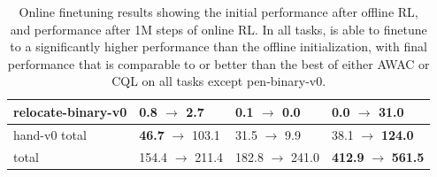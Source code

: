 \begin{table}[!htp]
\begin{tabular}{ l ||p{2.7cm} |p{2.7cm} | p{2.7cm}  }
    relocate-binary-v0 & \textbf{0.8}   $\rightarrow$ 2.7 & 0.1   $\rightarrow$ 0.0 & 0.0   $\rightarrow$ \textbf{31.0} \\ \hline
    hand-v0 total & \textbf{46.7}  $\rightarrow$ 103.1 & 31.5  $\rightarrow$ 9.9 & 38.1  $\rightarrow$ \textbf{124.0} \\ \hline \hline
    total & 154.4 $\rightarrow$ 211.4 & 182.8 $\rightarrow$ 241.0 & \textbf{412.9} $\rightarrow$ \textbf{561.5}
\end{tabular}
\captionsetup{justification=justified,format=plain}
\caption{Online finetuning results showing the initial performance after offline RL, and performance after 1M steps of online RL. In all tasks, \ourname is able to finetune to a significantly higher performance than the offline initialization, with final performance that is comparable to or better than the best of either AWAC or CQL on all tasks except pen-binary-v0.}
\label{tab:finetuning}
 \end{table}

